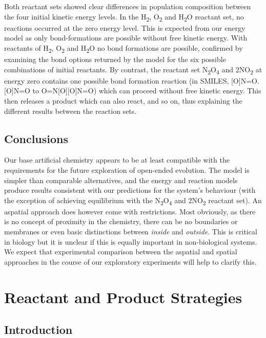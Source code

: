 Both reactant sets showed clear differences in population composition
between the four initial kinetic energy levels. In the
H\textsubscript{2}, O\textsubscript{2} and H\textsubscript{2}O reactant set, no reactions
occurred at the zero energy level. This is expected from our energy
model as only bond-formations are possible without free kinetic energy.
With reactants of H\textsubscript{2}, O\textsubscript{2} and H\textsubscript{2}O no bond formations are possible,
confirmed by examining the bond options returned by the model for the
six possible combinations of initial reactants. By contrast, the
reactant set N\textsubscript{2}O\textsubscript{4} and
2NO\textsubscript{2} at energy zero contains one possible bond formation
reaction (in SMILES, [O]N=O.[O]N=O to O=N[O][O]N=O)
which can proceed without free kinetic energy. This then releases a
product which can also react, and so on, thus explaining the different
results between the reaction sets.

\section{Conclusions}\label{conclusions}

Our base artificial chemistry appears to be at least compatible with the
requirements for the future exploration of open-ended evolution. The
model is simpler than comparable alternatives, and the energy and
reaction models produce results consistent with our predictions for the
system's behaviour (with the exception of achieving equilibrium with the
N\textsubscript{2}O\textsubscript{4} and 2NO\textsubscript{2} reactant
set). An aspatial approach does however come with restrictions. Most
obviously, as there is no concept of proximity in the chemistry, there
can be no boundaries or membranes or even basic distinctions between
\emph{inside} and \emph{outside}. This is critical in biology but it is
unclear if this is equally important in non-biological systems. We
expect that experimental comparison between the aspatial and spatial
approaches in the course of our exploratory experiments will help to
clarify this.

\chapter{Reactant and Product Strategies}\label{reactant-and-product-strategies}

\section{Introduction}\label{introduction-5}

